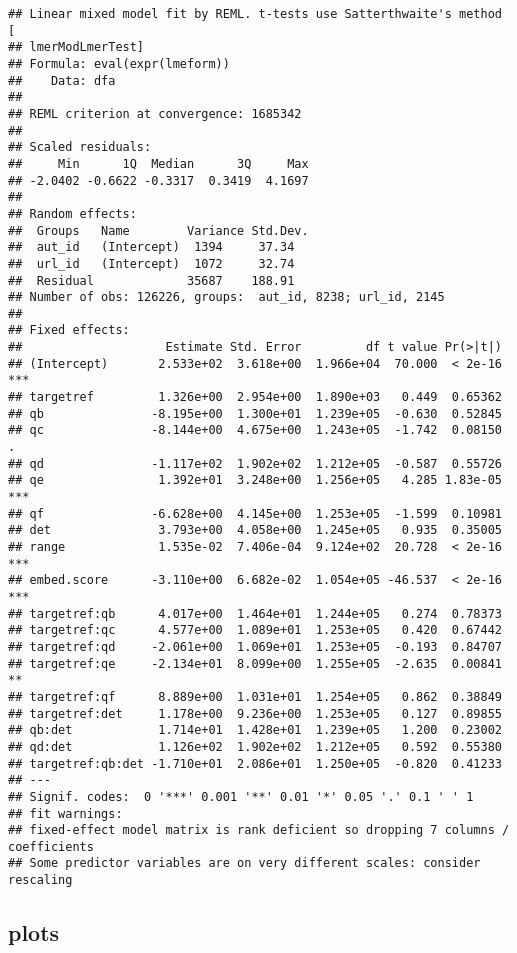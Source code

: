 \documentclass[
  12pt,
  oneside]{book}
\begin{document}
\begin{verbatim}
## Linear mixed model fit by REML. t-tests use Satterthwaite's method [
## lmerModLmerTest]
## Formula: eval(expr(lmeform))
##    Data: dfa
## 
## REML criterion at convergence: 1685342
## 
## Scaled residuals: 
##     Min      1Q  Median      3Q     Max 
## -2.0402 -0.6622 -0.3317  0.3419  4.1697 
## 
## Random effects:
##  Groups   Name        Variance Std.Dev.
##  aut_id   (Intercept)  1394     37.34  
##  url_id   (Intercept)  1072     32.74  
##  Residual             35687    188.91  
## Number of obs: 126226, groups:  aut_id, 8238; url_id, 2145
## 
## Fixed effects:
##                    Estimate Std. Error         df t value Pr(>|t|)    
## (Intercept)       2.533e+02  3.618e+00  1.966e+04  70.000  < 2e-16 ***
## targetref         1.326e+00  2.954e+00  1.890e+03   0.449  0.65362    
## qb               -8.195e+00  1.300e+01  1.239e+05  -0.630  0.52845    
## qc               -8.144e+00  4.675e+00  1.243e+05  -1.742  0.08150 .  
## qd               -1.117e+02  1.902e+02  1.212e+05  -0.587  0.55726    
## qe                1.392e+01  3.248e+00  1.256e+05   4.285 1.83e-05 ***
## qf               -6.628e+00  4.145e+00  1.253e+05  -1.599  0.10981    
## det               3.793e+00  4.058e+00  1.245e+05   0.935  0.35005    
## range             1.535e-02  7.406e-04  9.124e+02  20.728  < 2e-16 ***
## embed.score      -3.110e+00  6.682e-02  1.054e+05 -46.537  < 2e-16 ***
## targetref:qb      4.017e+00  1.464e+01  1.244e+05   0.274  0.78373    
## targetref:qc      4.577e+00  1.089e+01  1.253e+05   0.420  0.67442    
## targetref:qd     -2.061e+00  1.069e+01  1.253e+05  -0.193  0.84707    
## targetref:qe     -2.134e+01  8.099e+00  1.255e+05  -2.635  0.00841 ** 
## targetref:qf      8.889e+00  1.031e+01  1.254e+05   0.862  0.38849    
## targetref:det     1.178e+00  9.236e+00  1.253e+05   0.127  0.89855    
## qb:det            1.714e+01  1.428e+01  1.239e+05   1.200  0.23002    
## qd:det            1.126e+02  1.902e+02  1.212e+05   0.592  0.55380    
## targetref:qb:det -1.710e+01  2.086e+01  1.250e+05  -0.820  0.41233    
## ---
## Signif. codes:  0 '***' 0.001 '**' 0.01 '*' 0.05 '.' 0.1 ' ' 1
## fit warnings:
## fixed-effect model matrix is rank deficient so dropping 7 columns / coefficients
## Some predictor variables are on very different scales: consider rescaling
\end{verbatim}

\subsection{plots}\label{plots-4}
\end{document}
